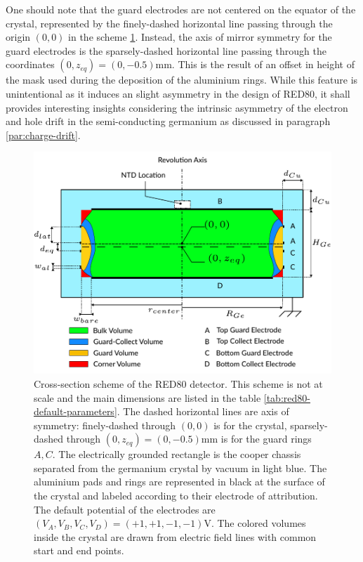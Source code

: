 One should note that the guard electrodes are not centered on the equator of the crystal, represented by the finely-dashed horizontal line passing through the origin $(0,0)$ in the scheme \ref{fig:red80-scheme}. Instead, the axis of mirror symmetry for the guard electrodes is the sparsely-dashed  horizontal line passing through the coordinates $(0, z_{eq})=(0, -0.5)\si{\mm}$. This is the result of an offset in height of the mask used during the deposition of the aluminium rings. While this feature is unintentional as it induces an slight asymmetry in the design of RED80, it shall provides interesting insights considering the intrinsic asymmetry of the electron and hole drift in the semi-conducting germanium as discussed in paragraph \ref{par:charge-drift}.

\begin{figure}
\centering
\includegraphics[scale=1]{Figures/ElectrodesExperimental/scheme_red80.pdf}
\caption{Cross-section scheme of the RED80 detector. This scheme is not at scale and the main dimensions are listed in the table \ref{tab:red80-default-parameters}. The dashed horizontal lines are axis of symmetry: finely-dashed through $(0,0)$ is for the crystal, sparsely-dashed through $(0, z_{eq})=(0, -0.5)\si{\mm}$  is for the guard rings $A,C$. The electrically grounded rectangle is the cooper chassis separated from the germanium crystal by vacuum in light blue. The aluminium pads and rings are represented in black at the surface of the crystal and labeled according to their electrode of attribution. The default potential of the electrodes are $(V_A, V_B, V_C, V_D) = (+1, +1, -1, -1) \si{\volt}$. The colored volumes inside the crystal are drawn from electric field lines with common start and end points.}
\label{fig:red80-scheme}
\end{figure}

